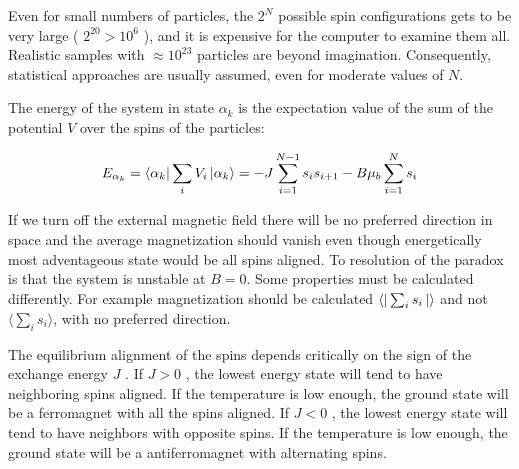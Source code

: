 \documentclass[12pt]{article}
\theoremstyle{plain}
\begin{document}
\vspace{2mm}

\par Even for small numbers of particles, the $2^N$ possible spin configurations gets to be very
large ( $2^{20} > 10^6$ ), and it is expensive for the computer to examine them all. Realistic samples
with $\approx 10^{23}$ particles are beyond imagination. Consequently, statistical approaches are usually
assumed, even for moderate values of $N$.

\vspace{2mm}

\par The energy of the system in state $\alpha_k$ is the expectation value of the sum of the potential $V$
over the spins of the particles:

\vspace{2mm}

\begin{equation}
    E_{\alpha_k} = \bra{\alpha_k}\sum_{i}V_i\ket{\alpha_k} = -J\sum_{i=1}^{N-1}s_i s_{i+1} - B\mu_{b}\sum_{i=1}^{N}s_i
    \label{energy}
\end{equation}

\vspace{2mm}

\par If we turn off the external magnetic field there will be no preferred
direction in space and the average magnetization should vanish even though
energetically most adventageous state would be all spins aligned. To
resolution of the paradox is that the system is unstable at $B=0$. Some properties must be
calculated differently. For example magnetization should be calculated $\bra{}\sum_{i}s_{i}\ket{}$
and not $\langle \sum_{i}s_{i}\rangle$, with no preferred direction.

\vspace{2mm}

\par The equilibrium alignment of the spins depends critically on the sign of the exchange
energy $J$ . If $J > 0$ , the lowest energy state will tend to have neighboring spins aligned. If the
temperature is low enough, the ground state will be a ferromagnet with all the spins aligned.
If $J < 0$ , the lowest energy state will tend to have neighbors with opposite spins. If the
temperature is low enough, the ground state will be a antiferromagnet with alternating spins.

\vspace{2mm}
\end{document}
